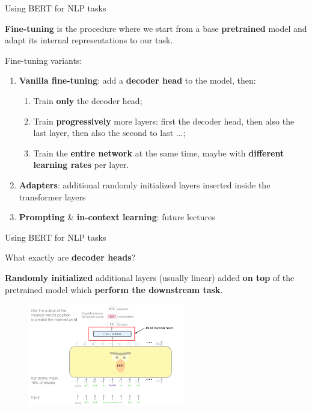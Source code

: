 \documentclass[12pt,aspectratio=169,handout]{beamer}
\begin{document}
\begin{frame}{Using BERT for NLP tasks}

	\textbf{Fine-tuning} is the procedure where we start from a base \textbf{pretrained} model and adapt its internal representations to our task.

	\pause

	Fine-tuning variants:
	\begin{enumerate}
		\item \textbf{Vanilla fine-tuning}: add a \textbf{decoder head} to the model, then:
		\pause
		\begin{enumerate}
			\pause
			\item Train \textbf{only} the decoder head;
			\pause
			\item Train \textbf{progressively} more layers: first the decoder head, then also the last layer, then also the second to last ...;
			\pause
			\item Train the \textbf{entire network} at the same time, maybe with \textbf{different learning rates} per layer.
		\end{enumerate} 
		\pause
		\item \textbf{Adapters}: additional randomly initialized layers inserted inside the transformer layers
		\pause
		\item \textbf{Prompting} \& \textbf{in-context learning}: future lectures
	\end{enumerate}

\end{frame}

\begin{frame}{Using BERT for NLP tasks}

What exactly are \textbf{decoder heads}?
\pause
\vspace{1em}

\textbf{Randomly initialized} additional layers (usually linear) added \textbf{on top} of the pretrained model which \textbf{perform the downstream task}.

\pause

\begin{figure}[h]
	\includegraphics[height=4.5cm]{bert-decoder-head-hl}
\end{figure}

\end{frame}
\end{document}
